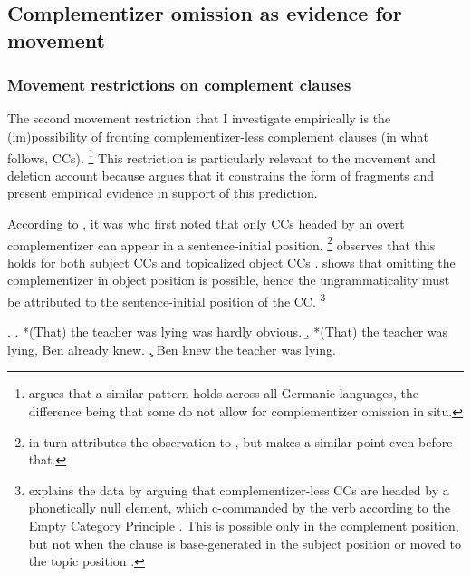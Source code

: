 \subsection{Complementizer omission as evidence for movement}\label{sec:ccs-background}
\subsubsection{Movement restrictions on complement clauses}
\begin{sloppypar}
The second movement restriction that I investigate empirically is the (im)possibi\-lity of fronting complementizer-less complement clauses (in what follows, CCs).%
%
\footnote{\citet[83--85]{webelhuth1992} argues that a similar pattern holds across all Germanic languages, the difference being that some do not allow for complementizer omission in situ.} %
%
This restriction is particularly relevant to the movement and deletion account because \citet{merchant2004} argues that it constrains the form of fragments and \citet{merchant.etal2013} present empirical evidence in support of this prediction.\end{sloppypar}

According to \citet{merchant2004}, it was \citet{stowell1981} who first noted that only CCs headed by an overt complementizer can appear in a sentence-initial position.%
%
\footnote{\citet{stowell1981} in turn attributes the observation to \citet{kayne1981}, but \citet[744]{morgan1973} makes a similar point even before that.}\afterfn%
%
\citet[396f]{stowell1981} observes that this holds for both subject CCs \Next[a] and topicalized object CCs \Next[b]. \Next[c] shows that omitting the complementizer in object position is possible, hence the ungrammaticality must be attributed to the sentence-initial position of the CC.%
%
\footnote{
\citet[396]{stowell1981} explains the data by arguing that complementizer-less CCs are headed by a phonetically null element, which c-commanded by the verb according to the Empty Category Principle \citep{chomsky1981}. This is possible only in the complement position, but not when the clause is base-generated in the subject position \Last[a] or moved to the topic position \Last[b].}\afterfn%
%

\ex. \a. *(That) the teacher was lying was hardly obvious.
      \b. *(That) the teacher was lying, Ben already knew.
 \c. Ben knew the teacher was lying.

